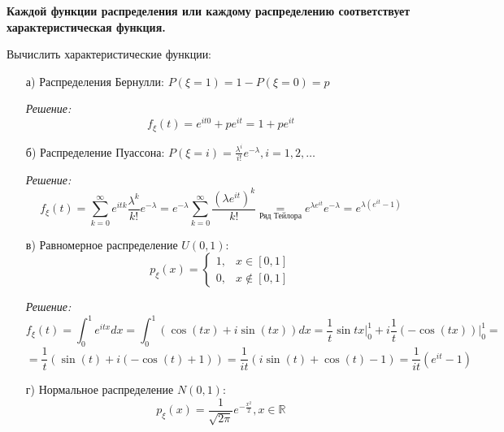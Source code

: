 \textbf{Каждой функции распределения или каждому распределению соответствует характеристическая функция.}
\begin{figure}[H]
\end{figure}
\begin{exmp}
	Вычислить характеристические функции:
	\begin{enumerate}
		\item[а)] Распределения Бернулли: $P(\xi = 1) = 1 - P(\xi = 0) = p$
		
		\textit{Решение:}
		\[ f_{\xi} (t) = e^{it 0} + p e^{it} = 1 + p e^{it} \]
		
		\item[б)] Распределение Пуассона: $P(\xi = i) = \frac{\lambda^i}{i!} e^{- \lambda}, i = 1, 2, \dots$
		
		\textit{Решение:}
		\[ f_{\xi} (t) = \sum_{k=0}^{\infty} e^{it k} \frac{\lambda^k}{k!} e^{-\lambda} = e^{-\lambda} \sum_{k=0}^{\infty} \frac{(\lambda e^{it})^k}{k!} \underset{\text{Ряд Тейлора}}{=} e^{\lambda e^{it}} e^{-\lambda} = e^{\lambda (e^{it} - 1)} \]
		
		\item[в)] Равномерное распределение $U(0, 1):$
		\[
		p_{\xi} (x) =
		\begin{cases}
		1, &x \in [0, 1] \\
		0, &x \notin [0, 1]
		\end{cases}
		\]
		
		\textit{Решение:}
		\[ f_{\xi} (t) = \int_{0}^{1} e^{it x} dx = \int_{0}^{1} (\cos (tx) + i \sin (tx)) dx = \frac{1}{t} \sin tx \bigg|_{0}^{1} + i \frac{1}{t} (- \cos (tx)) \bigg|_{0}^{1} = \]
		\[ = \frac{1}{t} ( \sin (t) + i ( - \cos (t) + 1 ) ) = \frac{1}{it} ( i \sin (t) + \cos (t) - 1 ) = \frac{1}{it} (e^{it} - 1) \]
		
		\item[г)] Нормальное распределение $N(0, 1):$
		\[ p_{\xi} (x) = \frac{1}{\sqrt{2 \pi}} e^{- \frac{x^2}{2}}, x \in \mathbb{R} \]
		

\end{enumerate}
\end{exmp}
